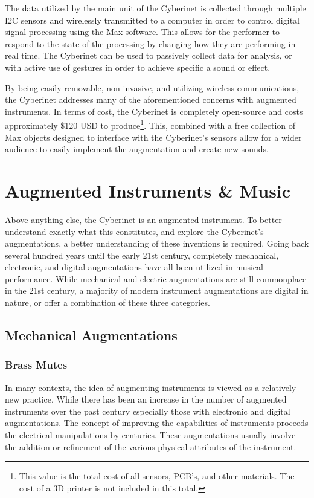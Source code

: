The data utilized by the main unit of the Cyberinet is collected through multiple I2C sensors and wirelessly transmitted to a computer in order to control digital signal processing using the Max software. This allows for the performer to respond to the state of the processing by changing how they are performing in real time. The Cyberinet can be used to passively collect data for analysis, or with active use of gestures in order to achieve specific a sound or effect.

By being easily removable, non-invasive, and utilizing wireless communications, the Cyberinet addresses many of the aforementioned concerns with augmented instruments. In terms of cost, the Cyberinet is completely open-source and costs approximately \$120 USD to produce\footnote{This value is the total cost of all sensors, PCB's, and other materials. The cost of a 3D printer is not included in this total.}. This, combined with a free collection of Max objects designed to interface with the Cyberinet's sensors allow for a wider audience to easily implement the augmentation and create new sounds.

\section{Augmented Instruments \& Music}


Above anything else, the Cyberinet is an augmented instrument. To better understand exactly what this constitutes, and explore the Cyberinet's augmentations, a better understanding of these inventions is required. Going back several hundred years until the early 21st century, completely mechanical, electronic, and digital augmentations have all been utilized in musical performance. While mechanical and electric augmentations are still commonplace in the 21st century, a majority of modern instrument augmentations are digital in nature, or offer a combination of these three categories.

\subsection{Mechanical Augmentations}

\subsubsection{Brass Mutes}
In many contexts, the idea of augmenting instruments is viewed as a relatively new practice. While there has been an increase in the number of augmented instruments over the past century especially those with electronic and digital augmentations. The concept of improving the capabilities of instruments proceeds the electrical manipulations by centuries. These augmentations usually involve the addition or refinement of the various physical attributes of the instrument.

